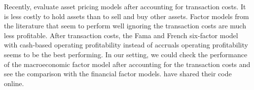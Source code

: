\documentclass[12pt,a4paper]{ouparticle}
\begin{document}


Recently, \cite{detzel2022model} evaluate asset pricing models after accounting for transaction costs. It is less costly to hold assets than to sell and buy other assets. Factor models from the literature that seem to perform well ignoring the transaction costs are much less profitable. After transaction costs, the Fama and French six-factor model \cite{fama2018choosing} with cash-based operating profitability instead of accruals operating profitability seems to be the best performing. In our setting, we could check the performance of the macroeconomic factor model after accounting for the transaction costs and see the comparison with the financial factor models. \cite{detzel2022model} have shared their code online.



\newpage



\end{document}
